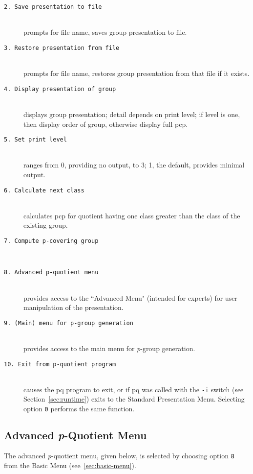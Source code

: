 \documentclass[12pt]{article}
\begin{document}
\begin{description}
\item[\texttt{2.\ Save presentation to file}]\ \\
 prompts for file name, saves group presentation to file.

\item[\texttt{3.\ Restore presentation from file}]\ \\
 prompts for file name, restores group presentation from that file if it exists.

\item[\texttt{4.\ Display presentation of group}]\ \\
 displays group presentation;
 detail depends on print level; if level is one, then display order
 of group, otherwise display full pcp.

\item[\texttt{5.\ Set print level}]\ \\
 ranges from 0, providing no output, to 3; 
 1, the default, provides minimal output. 

\item[\texttt{6.\ Calculate next class}]\ \\
 calculates pcp for quotient having one class greater than the 
 class of the existing group.

\item[\texttt{7.\ Compute p-covering group}]\ \\

\item[\texttt{8.\ Advanced p-quotient menu}]\ \\
 provides access to the ``Advanced Menu" (intended for experts)
 for user manipulation of the presentation.

\item[\texttt{9.\ (Main) menu for p-group generation}]\ \\
 provides access to the main menu for {\it p}-group generation.

\item[\texttt{10.\ Exit from p-quotient program}]\ \\
 causes the pq program to exit, or if pq was called with the \texttt{-i}
 switch (see Section~\ref{sec:runtime}) exits to the Standard Presentation
 Menu. Selecting option \texttt{0} performs the same function.

\end{description}

\subsection{Advanced {\it p}-Quotient Menu}\label{sec:advanced-pq-menu}
The advanced {\it p}-quotient menu, given below, is selected by 
choosing option \texttt{8} from the Basic Menu (see~\ref{sec:basic-menu}).
\end{document}
